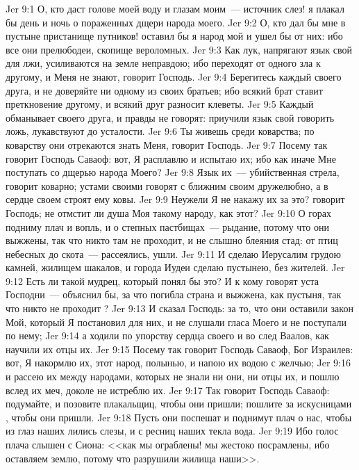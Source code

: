 \vs Jer 9:1 О, кто даст голове моей воду и глазам моим~--- источник слез! я плакал бы день и ночь о пораженных дщери народа моего.
\vs Jer 9:2 О, кто дал бы мне в пустыне пристанище путников! оставил бы я народ мой и ушел бы от них: ибо все они прелюбодеи, скопище вероломных.
\vs Jer 9:3 Как лук, напрягают язык свой для лжи, усиливаются на земле неправдою; ибо переходят от одного зла к другому, и Меня не знают, говорит Господь.
\vs Jer 9:4 Берегитесь каждый своего друга, и не доверяйте ни одному из своих братьев; ибо всякий брат ставит преткновение другому, и всякий друг разносит клеветы.
\vs Jer 9:5 Каждый обманывает своего друга, и правды не говорят: приучили язык свой говорить ложь, лукавствуют до усталости.
\vs Jer 9:6 Ты живешь среди коварства; по коварству они отрекаются знать Меня, говорит Господь.
\vs Jer 9:7 Посему так говорит Господь Саваоф: вот, Я расплавлю и испытаю их; ибо как иначе Мне поступать со дщерью народа Моего?
\vs Jer 9:8 Язык их~--- убийственная стрела, говорит коварно; устами своими говорят с ближним своим дружелюбно, а в сердце своем строят ему ковы.
\vs Jer 9:9 Неужели Я не накажу их за это? говорит Господь; не отмстит ли душа Моя такому народу, как этот?
\vs Jer 9:10 О горах подниму плач и вопль, и о степных пастбищах~--- рыдание, потому что они выжжены, так что никто там не проходит, и не слышно блеяния стад: от птиц небесных до скота~---  рассеялись, ушли.
\vs Jer 9:11 И сделаю Иерусалим грудою камней, жилищем шакалов, и города Иудеи сделаю пустынею, без жителей.
\vs Jer 9:12 Есть ли такой мудрец, который понял бы это? И к кому говорят уста Господни~--- объяснил бы, за что погибла страна и выжжена, как пустыня, так что никто не проходит ?
\rsbpar\vs Jer 9:13 И сказал Господь: за то, что они оставили закон Мой, который Я постановил для них, и не слушали гласа Моего и не поступали по нему;
\vs Jer 9:14 а ходили по упорству сердца своего и во след Ваалов, как научили их отцы их.
\vs Jer 9:15 Посему так говорит Господь Саваоф, Бог Израилев: вот, Я накормлю их, этот народ, полынью, и напою их водою с желчью;
\vs Jer 9:16 и рассею их между народами, которых не знали ни они, ни отцы их, и пошлю вслед их меч, доколе не истреблю их.
\vs Jer 9:17 Так говорит Господь Саваоф: подумайте, и позовите плакальщиц, чтобы они пришли; пошлите за искусницами , чтобы они пришли.
\vs Jer 9:18 Пусть они поспешат и поднимут плач о нас, чтобы из глаз наших лились слезы, и с ресниц наших текла вода.
\vs Jer 9:19 Ибо голос плача слышен с Сиона: <<как мы ограблены! мы жестоко посрамлены, ибо оставляем землю, потому что разрушили жилища наши>>.
